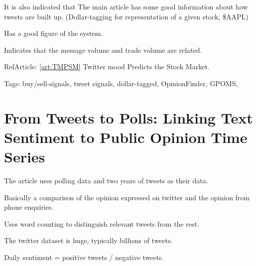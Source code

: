 It is also indicated that The main article has some good information about how
tweets are built up. (Dollar-tagging for representation of a given stock,
\$AAPL)

Has a good figure of the system. 

Indicates that the message volume and trade volume are related. 

RefArticle: \ref{art:TMPSM} Twitter mood Predicts the Stock Market.

Tags: buy/sell-signals, tweet signals, dollar-tagged, OpinionFinder, GPOMS, 

\section{From Tweets to Polls: Linking Text Sentiment to Public Opinion
Time
Series}

The article uses polling data and two years of tweets as their data. 

Basically a comparison of the opinion expressed on twitter and the opinion from
phone enquiries. 

Uses word counting to distinguish relevant tweets from the rest. 

The twitter dataset is huge, typically billions of tweets. 

Daily sentiment = positive tweets / negative tweets.

